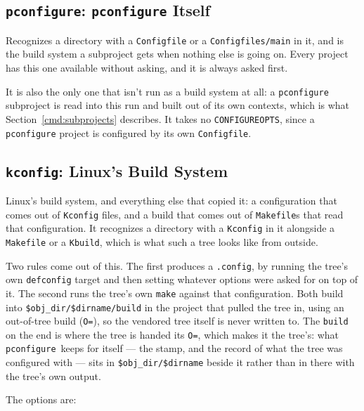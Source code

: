 \documentclass{article}
\newcommand{\pconfigure}{\texttt{pconfigure}}
\begin{document}
\subsection{\texttt{pconfigure}: \texttt{pconfigure} Itself
\label{buildsys:pconfigure}}

Recognizes a directory with a \texttt{Configfile} or a
\texttt{Configfiles/main} in it, and is the build system a
subproject gets when nothing else is going on.  Every project has
this one available without asking, and it is always asked first.

It is also the only one that isn't run as a build system at all: a
\texttt{pconfigure} subproject is read into this run and built out of
its own contexts, which is what Section~\ref{cmd:subprojects}
describes.  It takes no \texttt{CONFIGUREOPTS}, since a
\texttt{pconfigure} project is configured by its own
\texttt{Configfile}.

\subsection{\texttt{kconfig}: Linux's Build System \label{buildsys:kconfig}}

Linux's build system, and everything else that copied it: a
configuration that comes out of \texttt{Kconfig} files, and a build
that comes out of \texttt{Makefile}s that read that configuration.
It recognizes a directory with a \texttt{Kconfig} in it alongside a
\texttt{Makefile} or a \texttt{Kbuild}, which is what such a tree
looks like from outside.

Two rules come out of this.  The first produces a \texttt{.config},
by running the tree's own \texttt{defconfig} target and then setting
whatever options were asked for on top of it.  The second runs the
tree's own \texttt{make} against that configuration.  Both build into
\texttt{\$obj\_dir/\$dirname/build} in the project that pulled
the tree in, using an out-of-tree build (\texttt{O=}), so the vendored
tree itself is never written to.  The \texttt{build} on the end is
where the tree is handed its \texttt{O=}, which makes it the tree's:
what \pconfigure\ keeps for itself --- the stamp, and the record of
what the tree was configured with --- sits in
\texttt{\$obj\_dir/\$dirname} beside it rather than in there
with the tree's own output.

The options are:
\end{document}
